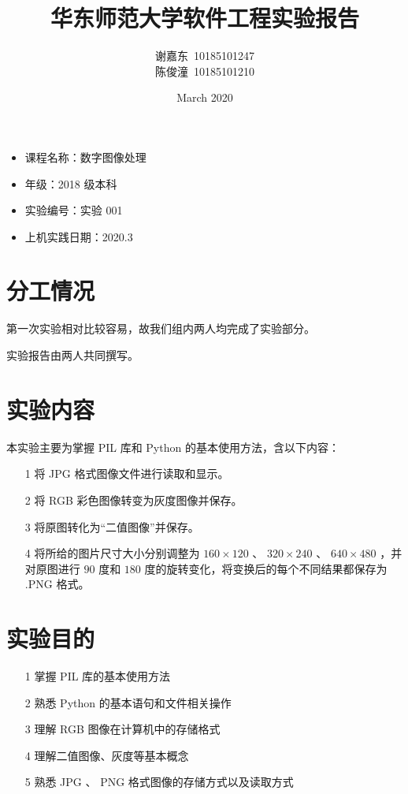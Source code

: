 \documentclass[11pt]{ctexart}
\title{华东师范大学软件工程实验报告}
\author{谢嘉东\ 10185101247\\陈俊潼\ 10185101210}
\date{March 2020}
\begin{document}
\maketitle

\thispagestyle{empty}

\begin{itemize}
    \item 课程名称：数字图像处理
    \item 年级：2018 级本科
    \item 实验编号：实验 001
    \item 上机实践日期：2020.3
\end{itemize}

\tableofcontents

\thispagestyle{empty}

\newpage

\section{分工情况}

第一次实验相对比较容易，故我们组内两人均完成了实验部分。

实验报告由两人共同撰写。

\section{实验内容}

本实验主要为掌握 PIL 库和 Python 的基本使用方法，含以下内容：

\begin{itemize}
    \item [1] 将 JPG 格式图像文件进行读取和显示。
    \item [2] 将 RGB 彩色图像转变为灰度图像并保存。
    \item [3] 将原图转化为“二值图像”并保存。
    \item [4]将所给的图片尺寸大小分别调整为 $160\times 120$ 、 $320\times 240$ 、 $640\times 480$ ，并对原图进行 $90$ 度和 $180$ 度的旋转变化，将变换后的每个不同结果都保存为 $\text{.PNG}$ 格式。
\end{itemize}

\section{实验目的}

\begin{itemize}
    \item [1] 掌握 PIL 库的基本使用方法
    \item [2] 熟悉 Python 的基本语句和文件相关操作
    \item [3] 理解 RGB 图像在计算机中的存储格式
    \item [4] 理解二值图像、灰度等基本概念
    \item [5] 熟悉 JPG 、 PNG 格式图像的存储方式以及读取方式
\end{itemize}
\end{document}
